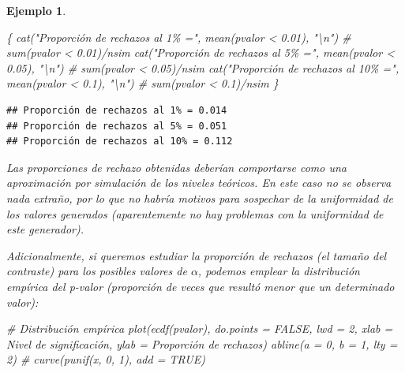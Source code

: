 \documentclass[
]{book}
\newenvironment{Shaded}{\begin{snugshade}}{\end{snugshade}}
\newcommand{\AttributeTok}[1]{\textcolor[rgb]{0.77,0.63,0.00}{#1}}
\newcommand{\CommentTok}[1]{\textcolor[rgb]{0.56,0.35,0.01}{\textit{#1}}}
\newcommand{\ConstantTok}[1]{\textcolor[rgb]{0.00,0.00,0.00}{#1}}
\newcommand{\DecValTok}[1]{\textcolor[rgb]{0.00,0.00,0.81}{#1}}
\newcommand{\FloatTok}[1]{\textcolor[rgb]{0.00,0.00,0.81}{#1}}
\newcommand{\FunctionTok}[1]{\textcolor[rgb]{0.00,0.00,0.00}{#1}}
\newcommand{\NormalTok}[1]{#1}
\newcommand{\SpecialCharTok}[1]{\textcolor[rgb]{0.00,0.00,0.00}{#1}}
\newcommand{\StringTok}[1]{\textcolor[rgb]{0.31,0.60,0.02}{#1}}
\theoremstyle{break}
\newtheorem{example}{Ejemplo}[chapter]
\theoremstyle{nonumberplain}
\begin{document}
\begin{example}
\begin{Shaded}
\begin{Highlighting}[]
\NormalTok{\{}
\FunctionTok{cat}\NormalTok{(}\StringTok{"Proporción de rechazos al 1\% ="}\NormalTok{, }\FunctionTok{mean}\NormalTok{(pvalor }\SpecialCharTok{\textless{}} \FloatTok{0.01}\NormalTok{), }\StringTok{"}\SpecialCharTok{\textbackslash{}n}\StringTok{"}\NormalTok{) }\CommentTok{\# sum(pvalor \textless{} 0.01)/nsim}
\FunctionTok{cat}\NormalTok{(}\StringTok{"Proporción de rechazos al 5\% ="}\NormalTok{, }\FunctionTok{mean}\NormalTok{(pvalor }\SpecialCharTok{\textless{}} \FloatTok{0.05}\NormalTok{), }\StringTok{"}\SpecialCharTok{\textbackslash{}n}\StringTok{"}\NormalTok{)   }\CommentTok{\# sum(pvalor \textless{} 0.05)/nsim}
\FunctionTok{cat}\NormalTok{(}\StringTok{"Proporción de rechazos al 10\% ="}\NormalTok{, }\FunctionTok{mean}\NormalTok{(pvalor }\SpecialCharTok{\textless{}} \FloatTok{0.1}\NormalTok{), }\StringTok{"}\SpecialCharTok{\textbackslash{}n}\StringTok{"}\NormalTok{)   }\CommentTok{\# sum(pvalor \textless{} 0.1)/nsim}
\NormalTok{\}}
\end{Highlighting}
\end{Shaded}

\begin{verbatim}
## Proporción de rechazos al 1% = 0.014 
## Proporción de rechazos al 5% = 0.051 
## Proporción de rechazos al 10% = 0.112
\end{verbatim}

Las proporciones de rechazo obtenidas deberían comportarse como una aproximación por simulación de los niveles teóricos.
En este caso no se observa nada extraño, por lo que no habría motivos para sospechar de la uniformidad de los valores generados (aparentemente no hay problemas con la uniformidad de este generador).

Adicionalmente, si queremos estudiar la proporción de rechazos (el \emph{tamaño del contraste}) para los posibles valores de \(\alpha\), podemos emplear la distribución empírica del p-valor (proporción de veces que resultó menor que un determinado valor):

\begin{Shaded}
\begin{Highlighting}[]
\CommentTok{\# Distribución empírica}
\FunctionTok{plot}\NormalTok{(}\FunctionTok{ecdf}\NormalTok{(pvalor), }\AttributeTok{do.points =} \ConstantTok{FALSE}\NormalTok{, }\AttributeTok{lwd =} \DecValTok{2}\NormalTok{, }
     \AttributeTok{xlab =} \StringTok{\textquotesingle{}Nivel de significación\textquotesingle{}}\NormalTok{, }\AttributeTok{ylab =} \StringTok{\textquotesingle{}Proporción de rechazos\textquotesingle{}}\NormalTok{)}
\FunctionTok{abline}\NormalTok{(}\AttributeTok{a =} \DecValTok{0}\NormalTok{, }\AttributeTok{b =} \DecValTok{1}\NormalTok{, }\AttributeTok{lty =} \DecValTok{2}\NormalTok{)   }\CommentTok{\# curve(punif(x, 0, 1), add = TRUE)}
\end{Highlighting}
\end{Shaded}


\end{example}
\end{document}
